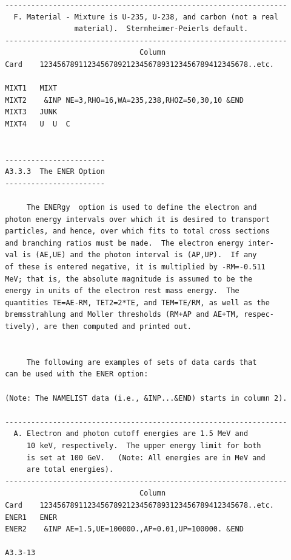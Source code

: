 \newpage {}  \begin{verbatim}
 -----------------------------------------------------------------
   F. Material - Mixture is U-235, U-238, and carbon (not a real
                 material).  Sternheimer-Peierls default.
 -----------------------------------------------------------------
                                Column
 Card    123456789112345678921234567893123456789412345678..etc.

 MIXT1   MIXT
 MIXT2    &INP NE=3,RHO=16,WA=235,238,RHOZ=50,30,10 &END
 MIXT3   JUNK
 MIXT4   U  U  C


 -----------------------
 A3.3.3  The ENER Option
 -----------------------

      The ENERgy  option is used to define the electron and
 photon energy intervals over which it is desired to transport
 particles, and hence, over which fits to total cross sections
 and branching ratios must be made.  The electron energy inter-
 val is (AE,UE) and the photon interval is (AP,UP).  If any
 of these is entered negative, it is multiplied by -RM=-0.511
 MeV; that is, the absolute magnitude is assumed to be the
 energy in units of the electron rest mass energy.  The
 quantities TE=AE-RM, TET2=2*TE, and TEM=TE/RM, as well as the
 bremsstrahlung and Moller thresholds (RM+AP and AE+TM, respec-
 tively), are then computed and printed out.


      The following are examples of sets of data cards that
 can be used with the ENER option:

 (Note: The NAMELIST data (i.e., &INP...&END) starts in column 2).

 -----------------------------------------------------------------
   A. Electron and photon cutoff energies are 1.5 MeV and
      10 keV, respectively.  The upper energy limit for both
      is set at 100 GeV.   (Note: All energies are in MeV and
      are total energies).
 -----------------------------------------------------------------
                                Column
 Card    123456789112345678921234567893123456789412345678..etc.
 ENER1   ENER
 ENER2    &INP AE=1.5,UE=100000.,AP=0.01,UP=100000. &END

 A3.3-13
\end{verbatim}
